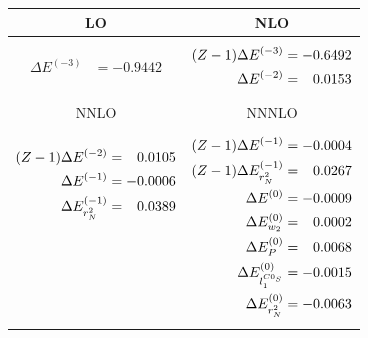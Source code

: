 \documentclass[prl,
twocolumn,
showpacs,preprintnumbers,amsmath,amssymb,
superscriptaddress,
a4paper,nofootinbib,longbibliography]{revtex4-2}
\def\hpm{\hphantom{-}}
\begin{document}
\begin{table}[htb]
    \centering
    \begin{tabular}{cc}
         \hline
         LO & NLO\\
         \hline
         \parbox{0.4\textwidth}{
         \begin{align}
             \Delta E^{(-3)}      & =   - 0.9442\nonumber\\
              & \nonumber
         \end{align}
         }
         & \parbox{0.4\textwidth}{
         \begin{align}
             (Z-1)\Delta E^{(-3)} & =   - 0.6492 \nonumber \\
             \Delta E^{(-2)}      & =\hpm 0.0153 \nonumber
         \end{align}
         }\\
         \hline\hline
          NNLO & NNNLO \\
          \hline
         \parbox{0.4\textwidth}{
         \begin{align}
             (Z-1)\Delta E^{(-2)} & =\hpm 0.0105 \nonumber\\
             \Delta E^{(-1)}      & =   - 0.0006 \nonumber\\
           \Delta E^{(-1)}_{r_N^2}& =\hpm 0.0389 \nonumber\\
             & \nonumber \\
             & \nonumber \\
             & \nonumber \\
             & \nonumber 
         \end{align}
         }
         & \parbox{0.4\textwidth}{
         \begin{align}
             (Z-1)\Delta E^{(-1)} & =   - 0.0004 \nonumber\\
      (Z-1)\Delta E^{(-1)}_{r_N^2}& =\hpm 0.0267 \nonumber\\
                    \Delta E^{(0)}& =   - 0.0009 \nonumber\\
              \Delta E^{(0)}_{w_2}& =\hpm 0.0002 \nonumber\\
                \Delta E^{(0)}_{P}& =\hpm 0.0068 \nonumber\\
       \Delta E^{(0)}_{l_1^{C0_S}}& =   - 0.0015 \nonumber\\
            \Delta E^{(0)}_{r_N^2}& =   - 0.0063 \nonumber 
         \end{align}
         }
         \\
         \hline

\end{tabular}
\end{table}
\end{document}
